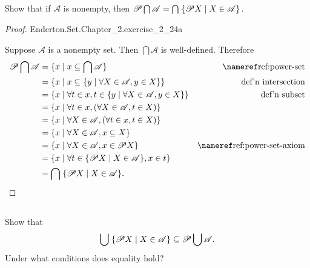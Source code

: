 \documentclass{report}
\begin{document}
\subsection{}%
\label{sub:exercise-2.24a}

Show that if $\mathscr{A}$ is nonempty, then
  $\mathscr{P}\bigcap\mathscr{A} =
    \bigcap\; \{\mathscr{P}X \mid X \in \mathscr{A} \}$.

\begin{proof}

    {Enderton.Set.Chapter\_2.exercise\_2\_24a}

  Suppose $\mathscr{A}$ is a nonempty set.
  Then $\bigcap \mathscr{A}$ is well-defined.
  Therefore
    \begin{align*}
      \powerset{\bigcap\mathscr{A}}
        & = \{ x \mid x \subseteq \bigcap \mathscr{A} \}
          & \textref{ref:power-set} \\
        & = \{ x \mid x \subseteq
          \{ y \mid \forall X \in \mathscr{A}, y \in X \} \}
          & \text{def'n intersection} \\
        & = \{ x \mid \forall t \in x,
          t \in \{ y \mid \forall X \in \mathscr{A}, y \in X \} \}
          & \text{def'n subset} \\
        & = \{ x \mid \forall t \in x,
          (\forall X \in \mathscr{A}, t \in X) \} \\
        & = \{ x \mid \forall X \in \mathscr{A},
          (\forall t \in x, t \in X) \} \\
        & = \{ x \mid \forall X \in \mathscr{A}, x \subseteq X \} \\
        & = \{ x \mid \forall X \in \mathscr{A}, x \in \powerset{X} \}
          & \textref{ref:power-set-axiom} \\
        & = \{ x \mid
          \forall t \in \{ \powerset{X} \mid X \in \mathscr{A} \}, x \in t \} \\
        & = \bigcap\; \{\powerset{X} \mid X \in \mathscr{A}\}.
    \end{align*}

\end{proof}

\subsection{}%
\label{sub:exercise-2.24b}

Show that
  \begin{equation}
    \label{sub:exercise-2.24b-eq1}
    \bigcup\; \{ \mathscr{P}X \mid X \in \mathscr{A} \} \subseteq
      \mathscr{P}\bigcup\mathscr{A}.
  \end{equation}
Under what conditions does equality hold?
\end{document}
